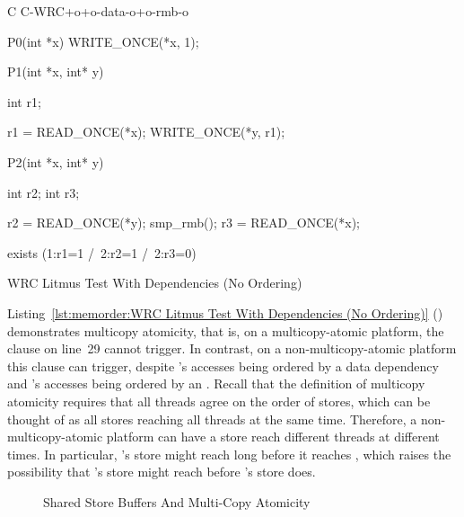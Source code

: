 \begin{listing}[tbp]
{ \scriptsize
\begin{verbbox}[\LstLineNo]
C C-WRC+o+o-data-o+o-rmb-o

{
}

P0(int *x)
{
  WRITE_ONCE(*x, 1);
}

P1(int *x, int* y)
{
  int r1;

  r1 = READ_ONCE(*x);
  WRITE_ONCE(*y, r1);
}

P2(int *x, int* y)
{
  int r2;
  int r3;

  r2 = READ_ONCE(*y);
  smp_rmb();
  r3 = READ_ONCE(*x);
}

exists (1:r1=1 /\ 2:r2=1 /\ 2:r3=0)
\end{verbbox}
}
\centering
\theverbbox
\caption{WRC Litmus Test With Dependencies (No Ordering)}
\label{lst:memorder:WRC Litmus Test With Dependencies (No Ordering)}
\end{listing}

Listing~\ref{lst:memorder:WRC Litmus Test With Dependencies (No Ordering)}
()
demonstrates multicopy atomicity, that is, on a multicopy-atomic platform,
the  clause on line~29 cannot trigger.
In contrast, on a non-multicopy-atomic
platform this  clause can trigger, despite
's accesses being ordered by a data dependency and 's
accesses being ordered by an .
Recall that the definition of multicopy atomicity requires that all
threads agree on the order of stores, which can be thought of as
all stores reaching all threads at the same time.
Therefore, a non-multicopy-atomic platform can have a store reach
different threads at different times.
In particular, 's store might reach  long before it
reaches , which raises the possibility that 's store
might reach  before 's store does.

\begin{figure}[tb]
\centering
{}
\caption{Shared Store Buffers And Multi-Copy Atomicity}
\label{fig:memorder:Shared Store Buffers And Multi-Copy Atomicity}
\end{figure}

